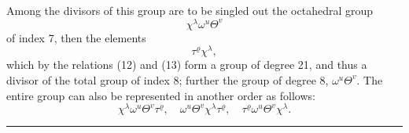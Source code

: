 Among the divisors of this group are to be singled out the
octahedral group
\[
\chi^\lambda \omega^u \Theta^v
\]
of index 7, then the elements
\[
\tau^\varrho \chi^\lambda,
\]
which by the relations (12) and (13) form a group of degree 21,
and thus a divisor of the total group of index 8;
further the group of degree 8, $\omega^u \Theta^v$. The entire group
can also be represented in another order as follows:
\[
\chi^\lambda \omega^u \Theta^v \tau^\varrho, \quad \omega^u \Theta^v \chi^\lambda \tau^\varrho, \quad \tau^\varrho \omega^u \Theta^v \chi^\lambda.
\]

\bigskip
\begin{center}
\rule{4cm}{0.4pt}
\end{center}
